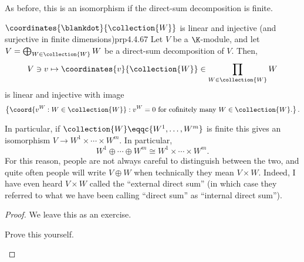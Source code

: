 As before, this is an isomorphism if the direct-sum decomposition is finite.
\begin{prp}{$\coordinates{\blankdot}{\collection{W}}$ is linear and injective (and surjective in finite dimensions)}{prp4.4.67}
	Let $V$ be a $\K$-module, and let $V=\bigoplus _{W\in \collection{W}}W$ be a direct-sum decomposition of $V$.  Then,
	\begin{equation}
		V\ni v\mapsto \coordinates{v}{\collection{W}}\in \prod _{W\in \collection{W}}W
	\end{equation}
	is linear and injective with image
	\begin{equation}
		\left\{ \coord{v^W:W\in \collection{W}}:v^W=0\text{ for cofinitely many }W\in \collection{W}\text{.}\right\} .
	\end{equation}
	\begin{rmk}
		In particular, if $\collection{W}\eqqc \{ W^1,\ldots ,W^m\}$ is finite this gives an isomorphism $V\rightarrow W^1\times \cdots \times W^m$.  In particular,
		\begin{equation}
			W^1\oplus \cdots \oplus W^m\cong W^1\times \cdots \times W^m.
		\end{equation}
		For this reason, people are not always careful to distinguish between the two, and quite often people will write $V\oplus W$ when technically they mean $V\times W$.  Indeed, I have even heard $V\times W$ called the ``external direct sum'' (in which case they referred to what we have been calling ``direct sum'' as ``internal direct sum'').
	\end{rmk}
	\begin{proof}
		We leave this as an exercise.
		\begin{exr}[breakable=false]{}{}
			Prove this yourself.
		\end{exr}
	\end{proof}
\end{prp}

